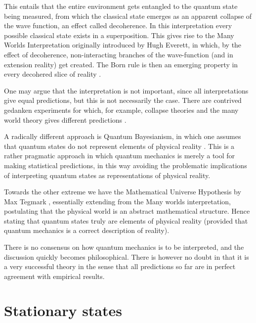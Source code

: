 This entails that the entire environment gets entangled to the quantum state being measured, from which the classical state emerges as an apparent collapse of the wave function, an effect called decoherence. In this interpretation every possible classical state exists in a superposition. This gives rise to the Many Worlds Interpretation originally introduced by Hugh Everett, in which, by the effect of decoherence, non-interacting branches of the wave-function (and in extension reality) get created. The Born rule is then an emerging property in every decohered slice of reality \cite{carroll EQM probability, wallace born rule}.

One may argue that the interpretation is not important, since all interpretations give equal predictions, but this is not necessarily the case. There are contrived gedanken experiments for which, for example, collapse theories and the many world theory gives different predictions \cite{vaidman mwi}.

A radically different approach is Quantum Bayesianism, in which one assumes that quantum states do not represent elements of physical reality \cite{qbism introduction, qbism and the greeks}. This is a rather pragmatic approach in which quantum mechanics is merely a tool for making statistical predictions, in this way avoiding the problematic implications of interpreting quantum states as representations of physical reality.

Towards the other extreme we have the Mathematical Universe Hypothesis by Max Tegmark \cite{tegmark}, essentially extending from the Many worlds interpretation, postulating that the physical world is an abstract mathematical structure. Hence stating that quantum states truly are elements of physical reality (provided that quantum mechanics is a correct description of reality).

There is no consensus on how quantum mechanics is to be interpreted, and the discussion quickly becomes philosophical. There is however no doubt in that it is a very successful theory in the sense that all predictions so far are in perfect agreement with empirical results.



\section{Stationary states}\label{sec: stationary states}

